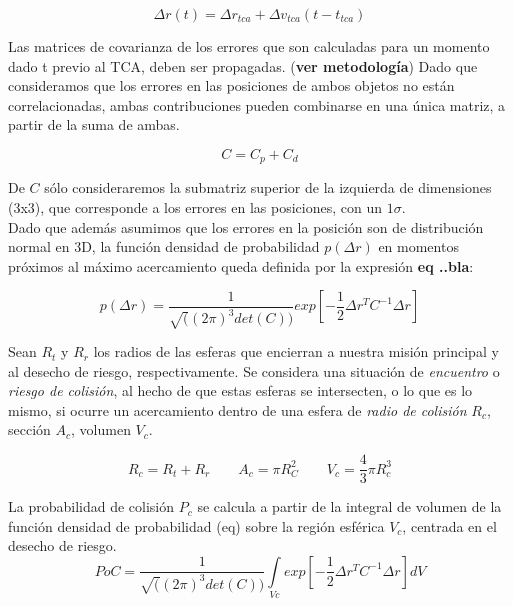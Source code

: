 \begin{equation}
 \Delta r(t)=\Delta r_{tca}+\Delta v_{tca}(t-t_{tca})
\end{equation}

Las matrices de covarianza de los errores que son calculadas para un momento dado t previo al TCA, deben ser propagadas. ({\bf{ver metodolog\'ia}})
Dado que consideramos que los errores en las posiciones de ambos objetos no est\'an correlacionadas, ambas contribuciones pueden combinarse en una \'unica matriz, a partir de la suma de ambas.

\begin{equation}
 C=C_{p}+C_{d}
\end{equation}

De $C$ s\'olo consideraremos la submatriz superior de la izquierda de dimensiones (3x3), que corresponde a los errores en las posiciones, con un $1 \sigma$.\\
Dado que adem\'as asumimos que los errores en la posici\'on son de distribuci\'on normal en 3D, la funci\'on densidad de probabilidad $p(\Delta r)$ en momentos pr\'oximos al m\'aximo acercamiento queda definida por la expresi\'on {\bf{eq ..bla}}:

\begin{equation}
 p(\Delta r)=\frac{1}{\sqrt((2 \pi)^3det(C))} exp[-\frac{1}{2}\Delta r^TC^{-1}\Delta r] 
\end{equation}



Sean $R_{t}$ y $R_{r}$ los radios de las esferas que encierran a nuestra misi\'on principal y al desecho de riesgo, respectivamente. Se considera una situaci\'on de {\it{encuentro}} o {\it{riesgo de colisi\'on}}, al hecho de que estas esferas se intersecten, o lo que es lo mismo, si ocurre un acercamiento dentro de una esfera de {\it{radio de colisi\'on}} $R_{c}$, secci\'on $A_{c}$,  volumen $V_{c}$.

\begin{equation}
R_{c}=R_{t}+R_{r} \qquad A_{c}=\pi R_{C}^{2} \qquad V_{c}=\frac{4}{3} \pi R_{c}^{3}
\end{equation}

La probabilidad de colisi\'on $P_{c}$ se calcula a partir de la integral de volumen de la funci\'on densidad de probabilidad (eq) sobre la regi\'on esf\'erica $V_{c}$, centrada en el desecho de riesgo.
\begin{equation}
PoC=\frac{1}{\sqrt((2\pi)^3det(C))} \int \limits_{Vc} exp[-\frac{1}{2}\Delta r^TC^{-1}\Delta r]dV
\label{eq:poc3d}
\end{equation}

